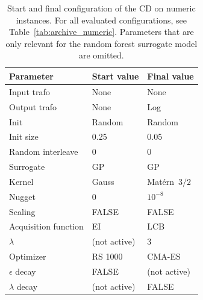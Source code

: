 \documentclass[12pt,letterpaper]{article}
\begin{document}
\begin{table}[ht]
  \centering
  \caption{Start and final configuration of the CD on numeric instances.
    For all evaluated configurations, see Table~\ref{tab:archive_numeric}.
    Parameters that are only relevant for the random forest surrogate model are omitted.}
  \label{tab:mlr3mbo-results-numeric}
  \begin{tabular}{lll}
    \toprule
    Parameter              & Start value & Final value \\
    \midrule
    Input trafo            & None          & None        \\
    Output trafo           & None          & Log         \\
    Init                   & Random        & Random      \\
    Init size              & 0.25          & 0.05        \\
    Random interleave      & 0             & 0           \\
    Surrogate              & GP            & GP          \\
    Kernel                 & Gauss         & Matérn~$3/2$  \\
    Nugget                 & 0             & $10^{-8}$        \\
    Scaling                & FALSE         & FALSE       \\
    Acquisition function   & EI            & LCB         \\
    $\lambda$              & (not active)              & 3           \\
    Optimizer & RS 1000       & CMA-ES      \\
    $\epsilon$ decay       & FALSE         &  (not active)           \\
    $\lambda$ decay        &   (not active)            & FALSE       \\
    \bottomrule
  \end{tabular}
\end{table}
\end{document}
